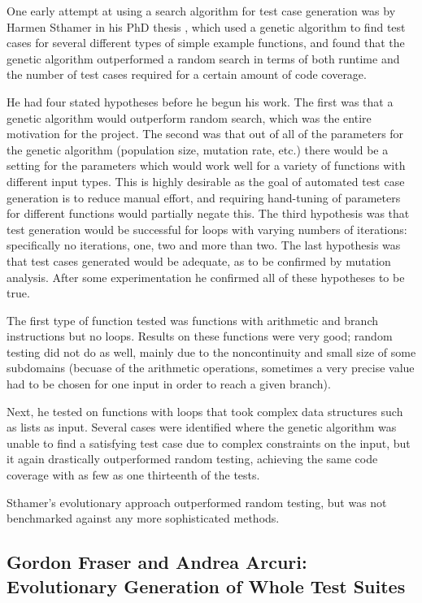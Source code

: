 \documentclass{sig-alternate-05-2015}
\begin{document}
One early attempt at using a search algorithm for test case generation was by
Harmen Sthamer in his PhD thesis \cite{sthamer}, which used a genetic algorithm
to find test
cases for several different types of simple example functions, and found that
the genetic algorithm outperformed a random search in terms of both runtime and
the number of test cases required for a certain amount of code coverage.

He had four stated hypotheses before he begun his work. The first was that a
genetic algorithm would outperform random search, which was the entire
motivation for the project. The second was that out of all of the parameters
for the genetic algorithm (population size, mutation rate, etc.) there would be
a setting for the parameters which would work well for a variety of functions
with different input types. This is highly desirable as the goal of automated
test case generation is to reduce manual effort, and requiring hand-tuning of
parameters for different functions would partially negate this. The third
hypothesis was that test generation would be successful for loops with varying
numbers of iterations: specifically no iterations, one, two and more than two.
The last hypothesis was that test cases generated would be adequate, as to be
confirmed by mutation analysis. After some experimentation he confirmed all of
these hypotheses to be true.

The first type of function tested was functions with arithmetic and branch
instructions but no loops. Results on these functions were very good; random
testing did not do as well, mainly due to the noncontinuity and small size of
some subdomains (becuase of the arithmetic operations, sometimes a very precise
value had to be chosen for one input in order to reach a given branch).

Next, he tested on functions with loops that took complex data structures such
as lists as input. Several cases were identified where the genetic algorithm
was unable to find a satisfying test case due to complex constraints on the
input, but it again drastically outperformed random testing, achieving the same
code coverage with as few as one thirteenth of the tests.

Sthamer's evolutionary approach outperformed random testing, but was not
benchmarked against any more sophisticated methods.

\subsection{Gordon Fraser and Andrea Arcuri: \\Evolutionary Generation of Whole
            Test Suites}
\label{wts}
\end{document}
